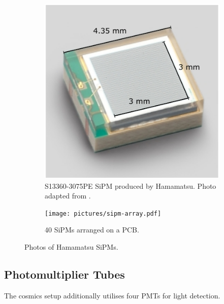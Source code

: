 \begin{figure}
	\centering
	\begin{subfigure}{.4\textwidth}
		\centering
		\includegraphics[width=\textwidth]{pictures/sipm.pdf}
		\caption{S13360-3075PE \ac{SiPM} produced by Hamamatsu. Photo adapted from \cite{HAMAMATSU-cell}.}
	\end{subfigure} \hfill%
	\begin{subfigure}{.5\textwidth}
		\centering
		\texttt{[image: pictures/sipm-array.pdf]}
		\caption{40 \acsp{SiPM} arranged on a \ac{PCB}.}
	\end{subfigure} 
	\caption{Photos of Hamamatsu \acsp{SiPM}.}
	\label{fig:sipm-photos}
\end{figure}





\subsection{Photomultiplier Tubes}


The cosmics setup additionally utilises four \acsp{PMT} for light detection.

